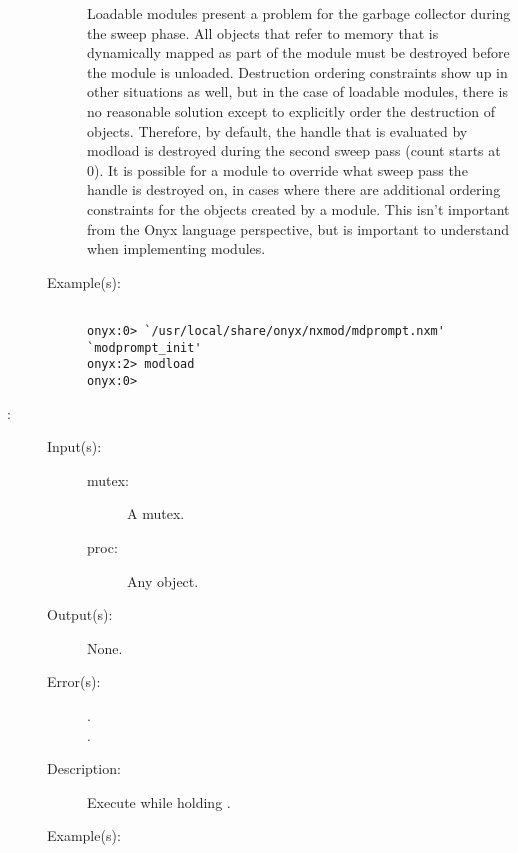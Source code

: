 \begin{description}
\begin{description}
		Loadable modules present a problem for the garbage collector
		during the sweep phase.  All objects that refer to memory that
		is dynamically mapped as part of the module must be destroyed
		before the module is unloaded.  Destruction ordering constraints
		show up in other situations as well, but in the case of loadable
		modules, there is no reasonable solution except to explicitly
		order the destruction of objects.  Therefore, by default, the
		handle that is evaluated by modload is destroyed during the
		second sweep pass (count starts at 0).  It is possible for a
		module to override what sweep pass the handle is destroyed on,
		in cases where there are additional ordering constraints for the
		objects created by a module.  This isn't important from the Onyx
		language perspective, but is important to understand when
		implementing modules.
	\item[Example(s): ]\begin{verbatim}

onyx:0> `/usr/local/share/onyx/nxmod/mdprompt.nxm' `modprompt_init'
onyx:2> modload
onyx:0>
	\end{verbatim}
	\end{description}
\label{systemdict:monitor}
\item[{\onyxop{mutex proc}{monitor}{--}}: ]
	\begin{description}\item[]
	\item[Input(s): ]
		\begin{description}\item[]
		\item[mutex: ]
			A mutex.
		\item[proc: ]
			Any object.
		\end{description}
	\item[Output(s): ] None.
	\item[Error(s): ]
		\begin{description}\item[]
		\item[.]
		\item[.]
		\end{description}
	\item[Description: ]
		Execute  while holding .
	\item[Example(s): ]\begin{verbatim}


\end{verbatim}
\end{description}
\end{description}
